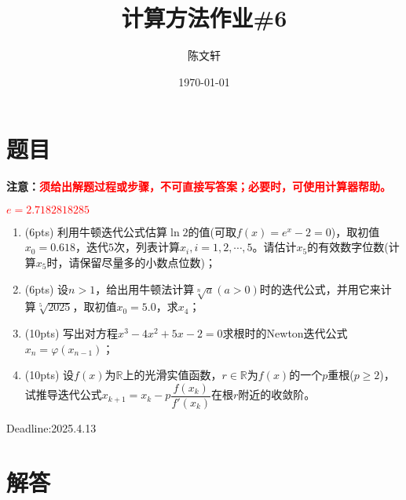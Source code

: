 \documentclass[cn,hazy,green,11pt,normal]{elegantnote}
\title{计算方法作业\#6}
\author{陈文轩}
\institute{KFRC}
\date{\today}
\begin{document}
\maketitle

\section{题目}

    \textbf{注意：\textcolor{red}{须给出解题过程或步骤，不可直接写答案；必要时，可使用计算器帮助。}}

    \textcolor{red}{$e=2.7182818285$}
    \begin{enumerate}
        \item (6pts) 利用牛顿迭代公式估算$\ln 2$的值(可取$f(x)=e^x-2=0$)，取初值$x_0=0.618$，迭代$5$次，列表计算$x_i,i=1,2,\cdots,5$。请估计$x_5$的有效数字位数(计算$x_5$时，请保留尽量多的小数点位数)；
        \item (6pts) 设$n>1$，给出用牛顿法计算$\sqrt[n]{a}(a>0)$时的迭代公式，并用它来计算$\sqrt[5]{2025}$，取初值$x_0=5.0$，求$x_4$；
        \item (10pts) 写出对方程$x^3-4x^2+5x-2=0$求根时的Newton迭代公式$x_n=\varphi(x_{n-1})$；
        \item (10pts) 设$f(x)$为$\mathbb{R}$上的光滑实值函数，$r\in\mathbb{R}$为$f(x)$的一个$p$重根($p\geq2$)，试推导迭代公式$x_{k+1}=x_k-p\dfrac{f(x_k)}{f'(x_k)}$在根$r$附近的收敛阶。
    \end{enumerate}

    Deadline:2025.4.13

\section{解答}
\end{document}
